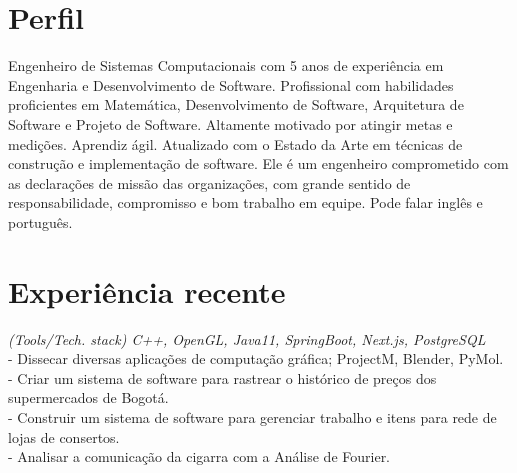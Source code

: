 \documentclass[]{CV-JuanCamiloFlorez}
\begin{document}
\begin{minipage}[t]{0.66\textwidth} 


\section{Perfil}
Engenheiro de Sistemas Computacionais com 5 anos de experiência em Engenharia e Desenvolvimento de Software. Profissional com habilidades proficientes em Matemática, Desenvolvimento de Software, Arquitetura de Software e Projeto de Software. Altamente motivado por atingir metas e medições. Aprendiz ágil. Atualizado com o Estado da Arte em técnicas de construção e implementação de software. Ele é um engenheiro comprometido com as declarações de missão das organizações, com grande sentido de responsabilidade, compromisso e bom trabalho em equipe. Pode falar inglês e português.


\sectionsep

\section{Experiência recente}
    \textit{(Tools/Tech. stack) C++, OpenGL, Java11, SpringBoot, Next.js, PostgreSQL} \\
        - Dissecar diversas aplicações de computação gráfica; ProjectM, Blender, PyMol. \\
        - Criar um sistema de software para rastrear o histórico de preços dos supermercados de Bogotá. \\
        - Construir um sistema de software para gerenciar trabalho e itens para rede de lojas de consertos. \\
        - Analisar a comunicação da cigarra com a Análise de Fourier. \\
        \sectionsep


\end{minipage}
\end{document}
